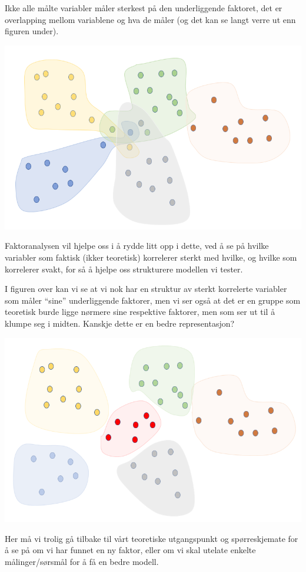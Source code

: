 \documentclass[
]{article}
\begin{document}
Ikke alle målte variabler måler sterkest på den underliggende faktoret, det er overlapping mellom variablene og hva de måler (og det kan se langt verre ut enn figuren under).

\includegraphics{faktoranalyse5.png}

Faktoranalysen vil hjelpe oss i å rydde litt opp i dette, ved å se på hvilke variabler som faktisk (ikker teoretisk) korrelerer sterkt med hvilke, og hvilke som korrelerer svakt, for så å hjelpe oss strukturere modellen vi tester.

I figuren over kan vi se at vi nok har en struktur av sterkt korrelerte variabler som måler ``sine'' underliggende faktorer, men vi ser også at det er en gruppe som teoretisk burde ligge nørmere sine respektive faktorer, men som ser ut til å klumpe seg i midten. Kanskje dette er en bedre representasjon?

\includegraphics{faktoranalyse6.png}

Her må vi trolig gå tilbake til vårt teoretiske utgangspunkt og spørreskjemate for å se på om vi har funnet en ny faktor, eller om vi skal utelate enkelte målinger/sørsmål for å få en bedre modell.
\end{document}

